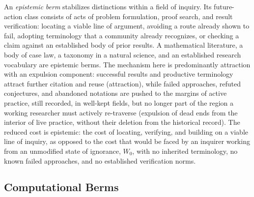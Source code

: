 \documentclass[11pt]{article}
\begin{document}
An \emph{epistemic berm} stabilizes distinctions within a field of inquiry. Its future-action class consists of acts of problem formulation, proof search, and result verification: locating a viable line of argument, avoiding a route already shown to fail, adopting terminology that a community already recognizes, or checking a claim against an established body of prior results. A mathematical literature, a body of case law, a taxonomy in a natural science, and an established research vocabulary are epistemic berms. The mechanism here is predominantly attraction with an expulsion component: successful results and productive terminology attract further citation and reuse (attraction), while failed approaches, refuted conjectures, and abandoned notations are pushed to the margins of active practice, still recorded, in well-kept fields, but no longer part of the region a working researcher must actively re-traverse (expulsion of dead ends from the interior of live practice, without their deletion from the historical record). The reduced cost is epistemic: the cost of locating, verifying, and building on a viable line of inquiry, as opposed to the cost that would be faced by an inquirer working from an unmodified state of ignorance, $W_0$, with no inherited terminology, no known failed approaches, and no established verification norms.

\subsection{Computational Berms}
\end{document}
